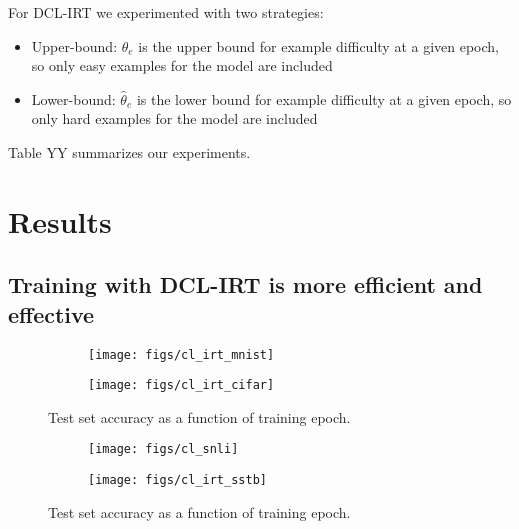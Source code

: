\documentclass[letterpaper]{article} %
\begin{document}
For DCL-IRT we experimented with two strategies:

\begin{itemize}
	\item 
	Upper-bound: $\hat{\theta}_e$ is the upper bound for example difficulty at a given epoch, so only easy examples for the model are included
	\item 
	Lower-bound: $\hat{\theta}_e$ is the lower bound for example difficulty at a given epoch, so only hard examples for the model are included
\end{itemize}

Table YY summarizes our experiments.


\section{Results} 

\subsection{Training with DCL-IRT is more efficient and effective}
\captionsetup[subfigure]{labelformat=empty}
\begin{figure*}[th!]
	\centering
	\begin{subfigure}[b]{0.45\textwidth}
		\centering
		\texttt{[image: figs/cl\_irt\_mnist]}
		\caption{\label{fig:cl_mnist}} 
		\vspace{-2em} 
	\end{subfigure} 
	\begin{subfigure}[b]{0.45\textwidth}
		\centering
		\texttt{[image: figs/cl\_irt\_cifar]}
		\caption{\label{fig:cl_cifar}} 
		\vspace{-2em} 
	\end{subfigure} 
	
	\caption{Test set accuracy as a function of training epoch.}
	\label{fig:acc_viz}
\end{figure*}

\captionsetup[subfigure]{labelformat=empty}
\begin{figure*}[th!]
	\centering
	\begin{subfigure}[b]{0.45\textwidth}
		\centering
		\texttt{[image: figs/cl\_snli]}
		\caption{\label{fig:cl_snli}} 
		\vspace{-2em} 
	\end{subfigure} 
	\begin{subfigure}[b]{0.45\textwidth}
		\centering
		\texttt{[image: figs/cl\_irt\_sstb]}
		\caption{\label{fig:cl_sstb}} 
		\vspace{-2em} 
	\end{subfigure} 
	
	\caption{Test set accuracy as a function of training epoch.}
	\label{fig:acc_nlp}
\end{figure*}
\end{document}
